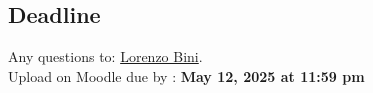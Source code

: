 \subsection*{Deadline}
Any questions to: \href{mailto:Lorenzo.Bini@unige.ch}{Lorenzo Bini}.\\
Upload on Moodle due by : \textbf{May 12, 2025 at 11:59 pm}